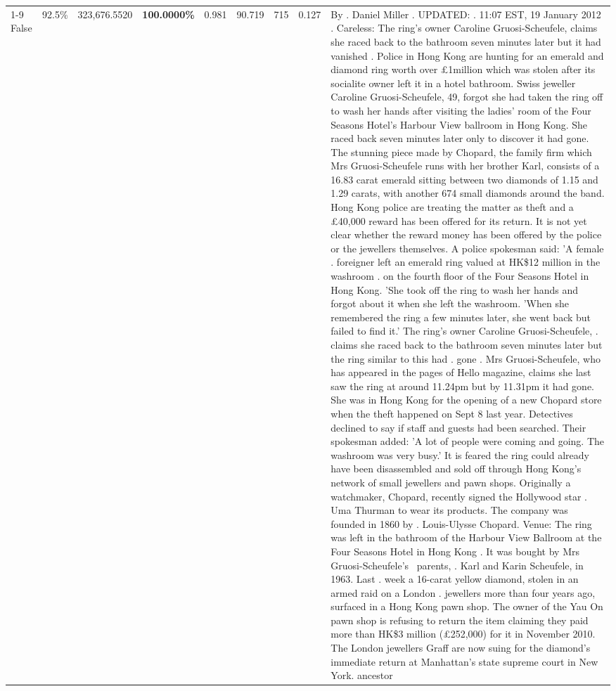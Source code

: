 \begin{table}[H]
\begin{tabular}{lllrlllll}
\cline{1-9} \cline{2-9}
False & 92.5\% & 323,676.5520 & \bfseries \color{red} 100.0000\% & 0.981 & 90.719 & 715 & 0.127 & By . Daniel Miller . UPDATED: . 11:07 EST, 19 January 2012 . Careless: The ring's owner Caroline Gruosi-Scheufele, claims she raced back to the bathroom seven minutes later but it had vanished . Police in Hong Kong are hunting for an emerald and diamond ring worth over £1million which was stolen after its socialite owner left it in a hotel bathroom. Swiss jeweller Caroline Gruosi-Scheufele, 49, forgot she had taken the ring off to wash her hands after visiting the ladies' room of the Four Seasons Hotel's Harbour View ballroom in Hong Kong. She raced back seven minutes later only to discover it had gone. The stunning piece made by Chopard, the family firm which Mrs Gruosi-Scheufele runs with her brother Karl, consists of a 16.83 carat emerald sitting between two diamonds of 1.15 and 1.29 carats, with another 674 small diamonds around the band. Hong Kong police are treating the matter as theft and a £40,000 reward has been offered for its return. It is not yet clear whether the reward money has been offered by the police or the jewellers themselves. A police spokesman said: 'A female . foreigner left an emerald ring valued at HK\$12 million in the washroom . on the fourth floor of the Four Seasons Hotel in Hong Kong. 'She took off the ring to wash her hands and forgot about it when she left the washroom. 'When she remembered the ring a few minutes later, she went back but failed to find it.' The ring's owner Caroline Gruosi-Scheufele, . claims she raced back to the bathroom seven minutes later but the ring similar to this had . gone . Mrs Gruosi-Scheufele, who has appeared in the pages of Hello magazine, claims she last saw the ring at around 11.24pm but by 11.31pm it had gone. She was in Hong Kong for the opening of a new Chopard store when the theft happened on Sept 8 last year. Detectives declined to say if staff and guests had been searched. Their spokesman added: 'A lot of people were coming and going. The washroom was very busy.' It is feared the ring could already have been disassembled and sold off through Hong Kong's network of small jewellers and pawn shops. Originally a watchmaker, Chopard, recently signed the Hollywood star . Uma Thurman to wear its products. The company was founded in 1860 by . Louis-Ulysse Chopard. Venue: The ring was left in the bathroom of the Harbour View Ballroom at the Four Seasons Hotel in Hong Kong . It was bought by Mrs Gruosi-Scheufele's  parents, . Karl and Karin Scheufele, in 1963. Last . week a 16-carat yellow diamond, stolen in an armed raid on a London . jewellers more than four years ago, surfaced in a Hong Kong pawn shop. The owner of the Yau On pawn shop is refusing to return the item claiming they paid more than HK\$3 million (£252,000) for it in November 2010. The London jewellers Graff are now suing for the diamond’s immediate return at Manhattan’s state supreme court in New York. ancestor \\

\end{tabular}
\end{table}
